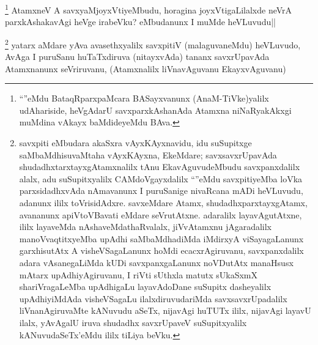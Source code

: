 
\begin{artha}
\footnote[1]{``\stext''eMdu BataqRparxpaMcara BASayxvanunx (AnaM-TiVke)yalilx udAhariside, heVgAdarU savxparxkAshanAda Atamxna niNaRyakAkxgi muMdina vAkayx baMdideyeMdu BAva.}
AtamxneV A savxyaMjoyxVtiyeMbudu, horagina joyxVtigaLilalxde neVrA parxkAshakavAgi heVge irabeVku? eMbudanunx I muMde heVLuvudu||
\end{artha}


\begin{artha}
\footnote[2]{savxpiti eMbudara akaSxra vAyxKAyxnavidu, idu suSupitxge saMbaMdhisuvaMtaha vAyxKAyxna, EkeMdare; savxsavxrUpavAda shudadhxtarxtayxgAtamxnalilx tAnu EkavAguvudeMbudu savxpanxdalilx alalx, adu suSupitxyalilx CAMdoVgayxdalilx ``\stext''eMdu savxpitiyeMba loVka parxsidadhxvAda nAmavanunx I puruSanige nivaRcana mADi heVLuvudu, adanunx ililx toVrisidAdxre. savxeMdare Atamx, shudadhxparxtayxgAtamx, avananunx apiVtoVBavati eMdare seVrutAtxne. adaralilx layavAgutAtxne, ililx layaveMda nAshaveMdathaRvalalx, jiVvAtamxnu jAgaradalilx manoVvaqtitxyeMba upAdhi saMbaMdhadiMda iMdirxyA viSayagaLanunx garxhisutAtx A visheVSagaLanunx hoMdi ecacxrAgiruvanu, savxpanxdalilx adara vAsanegaLiMda kUDi savxpanxgaLanunx noVDutAtx manaHsusx mAtarx upAdhiyAgiruvanu, I riVti sUthxla matutx sUkaSxmX shariVragaLeMba upAdhigaLu layavAdoDane suSupitx dasheyalilx upAdhiyiMdAda visheVSagaLu ilalxdiruvudariMda savxsavxrUpadalilx liVnanAgiruvaMte kANuvudu aSeTx, nijavAgi huTUTx ililx, nijavAgi layavU ilalx, yAvAgalU iruva shudadhx savxrUpaveV suSupitxyalilx kANuvudaSeTx'eMdu ililx tiLiya beVku.}
yatarx aMdare yAva avasethxyalilx savxpitiV (malaguvaneMdu) heVLuvudo, AvAga I puruSanu huTaTxdiruva (nitayxvAda) tananx savxrUpavAda Atamxnanunx seVriruvanu, (Atamxnalilx liVnavAguvanu EkayxvAguvanu)
\end{artha}
